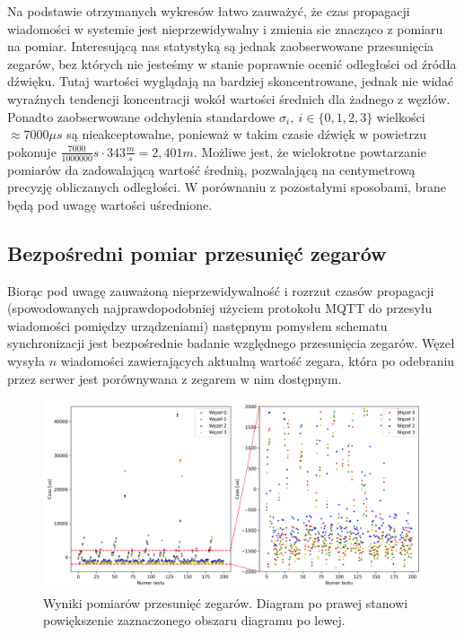 Na podstawie otrzymanych wykresów łatwo zauważyć, że czas propagacji wiadomości w systemie jest nieprzewidywalny i zmienia sie znacząco z pomiaru na pomiar. Interesującą nas statystyką są jednak zaobserwowane przesunięcia zegarów, bez których nie jesteśmy w stanie poprawnie ocenić odległości od źródła dźwięku. Tutaj wartości wyglądają na bardziej skoncentrowane, jednak nie widać wyraźnych tendencji koncentracji wokół wartości średnich dla żadnego z węzłów. Ponadto zaobserwowane odchylenia standardowe $\sigma_i,\ i \in \{0,1,2,3\}$ wielkości $\approx 7000 \mu s$ są nieakceptowalne, ponieważ w takim czasie dźwięk w powietrzu pokonuje $\frac{7000}{1000000}s \cdot 343\frac{m}{s} = 2,401m$. Możliwe jest, że wielokrotne powtarzanie pomiarów da zadowalającą wartość średnią, pozwalającą na centymetrową precyzję obliczanych odległości. W porównaniu z pozostałymi sposobami, brane będą pod uwagę wartości uśrednione.

\subsection{Bezpośredni pomiar przesunięć zegarów}\label{sec:time_deltas_sync}

Biorąc pod uwagę zauważoną nieprzewidywalność i rozrzut czasów propagacji (spowodowanych najprawdopodobniej użyciem protokołu MQTT do przesyłu wiadomości pomiędzy urządzeniami) następnym pomysłem schematu synchronizacji jest bezpośrednie badanie względnego przesunięcia zegarów. Węzeł wysyła $n$ wiadomości zawierających aktualną wartość zegara, która po odebraniu przez serwer jest porównywana z zegarem w nim dostępnym.

\begin{figure}[H]
    \centering
    \includegraphics[width=\textwidth]{pics/time_deltas/time_deltas.png}
    \caption[Wyniki pomiarów przesunięć zegarów]{Wyniki pomiarów przesunięć zegarów. Diagram po prawej stanowi powiększenie zaznaczonego obszaru diagramu po lewej.}
    \label{pic:offsets_deltas}
\end{figure}

